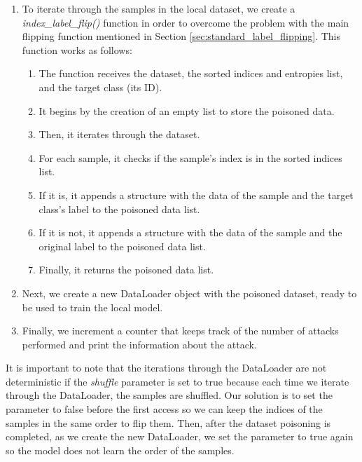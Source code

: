 \begin{enumerate}
        \item To iterate through the samples in the local dataset, we create a \textit{index\_label\_flip()} function %
        in order to overcome the problem with the main flipping function mentioned in Section \ref{sec:standard_label_flipping}. This function works as follows:
                \begin{enumerate}
                        \item The function receives the dataset, the sorted indices and entropies list, and the target class (its ID).
                        \item It begins by the creation of an empty list to store the poisoned data.
                        \item Then, it iterates through the dataset.
                        \item For each sample, it checks if the sample's index is in the sorted indices list.
                        \item If it is, it appends a structure with the data of the sample and the target class's label to the poisoned data list.
                        \item If it is not, it appends a structure with the data of the sample and the original label to the poisoned data list.
                        \item Finally, it returns the poisoned data list.
                \end{enumerate}
        \item Next, we create a new DataLoader object with the poisoned dataset, ready to be used to train the local model.
        \item Finally, we increment a counter that keeps track of the number of attacks performed and print the information about the attack.
\end{enumerate}


It is important to note that the iterations through the DataLoader are not deterministic if the \textit{shuffle} parameter is set to true because each time we iterate through the DataLoader, the samples are shuffled. Our solution is to set the parameter to false before the first access so we can keep the indices of the samples in the same order to flip them. Then, after the dataset poisoning is completed, as we create the new DataLoader, we set the parameter to true again so the model does not learn the order of the samples.








